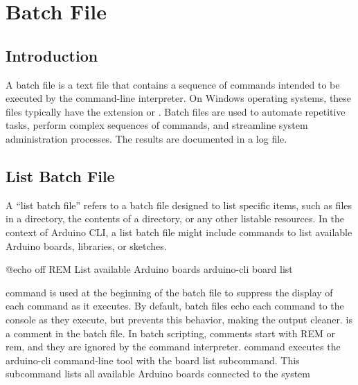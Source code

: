 %
%

\lstset{language=PowerShell}

\chapter{Batch File}

\section{Introduction}

A batch file is a text file that contains a sequence of commands intended to be executed by the command-line interpreter. On Windows operating systems, these files typically have the extension  or . Batch files are used to automate repetitive tasks, perform complex sequences of commands, and streamline system administration processes. The results are documented in a log file.  \cite{microsoftWindowsCommands:2025}

\section{List Batch File}
A ``list batch file'' refers to a batch file designed to list specific items, such as files in a directory, the contents of a directory, or any other listable resources. In the context of Arduino CLI, a list batch file might include commands to list available Arduino boards, libraries, or sketches.

	\begin{PowerShell}
@echo off
REM List available Arduino boards
arduino-cli board list
	\end{PowerShell}

 command is used at the beginning of the batch file to suppress the display of each command as it executes. By default, batch files echo each command to the console as they execute, but  prevents this behavior, making the output cleaner. 
 is a comment in the batch file. In batch scripting, comments start with REM or rem, and they are ignored by the command interpreter.
 command executes the arduino-cli command-line tool with the board list subcommand. This subcommand lists all available Arduino boards connected to the system

